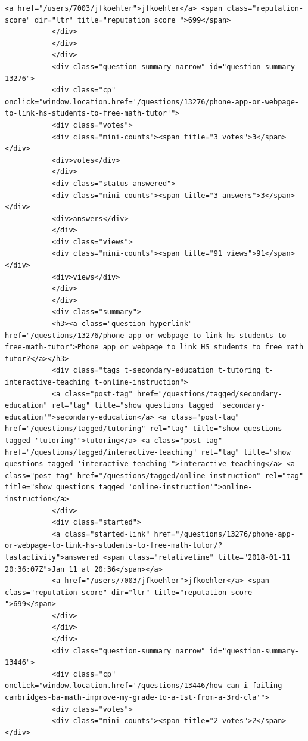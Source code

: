 \documentclass[11pt]{article}
\begin{document}
\begin{Verbatim}[commandchars=\\\{\}]
           <a href="/users/7003/jfkoehler">jfkoehler</a> <span class="reputation-score" dir="ltr" title="reputation score ">699</span>
           </div>
           </div>
           </div>
           <div class="question-summary narrow" id="question-summary-13276">
           <div class="cp" onclick="window.location.href='/questions/13276/phone-app-or-webpage-to-link-hs-students-to-free-math-tutor'">
           <div class="votes">
           <div class="mini-counts"><span title="3 votes">3</span></div>
           <div>votes</div>
           </div>
           <div class="status answered">
           <div class="mini-counts"><span title="3 answers">3</span></div>
           <div>answers</div>
           </div>
           <div class="views">
           <div class="mini-counts"><span title="91 views">91</span></div>
           <div>views</div>
           </div>
           </div>
           <div class="summary">
           <h3><a class="question-hyperlink" href="/questions/13276/phone-app-or-webpage-to-link-hs-students-to-free-math-tutor">Phone app or webpage to link HS students to free math tutor?</a></h3>
           <div class="tags t-secondary-education t-tutoring t-interactive-teaching t-online-instruction">
           <a class="post-tag" href="/questions/tagged/secondary-education" rel="tag" title="show questions tagged 'secondary-education'">secondary-education</a> <a class="post-tag" href="/questions/tagged/tutoring" rel="tag" title="show questions tagged 'tutoring'">tutoring</a> <a class="post-tag" href="/questions/tagged/interactive-teaching" rel="tag" title="show questions tagged 'interactive-teaching'">interactive-teaching</a> <a class="post-tag" href="/questions/tagged/online-instruction" rel="tag" title="show questions tagged 'online-instruction'">online-instruction</a>
           </div>
           <div class="started">
           <a class="started-link" href="/questions/13276/phone-app-or-webpage-to-link-hs-students-to-free-math-tutor/?lastactivity">answered <span class="relativetime" title="2018-01-11 20:36:07Z">Jan 11 at 20:36</span></a>
           <a href="/users/7003/jfkoehler">jfkoehler</a> <span class="reputation-score" dir="ltr" title="reputation score ">699</span>
           </div>
           </div>
           </div>
           <div class="question-summary narrow" id="question-summary-13446">
           <div class="cp" onclick="window.location.href='/questions/13446/how-can-i-failing-cambridges-ba-math-improve-my-grade-to-a-1st-from-a-3rd-cla'">
           <div class="votes">
           <div class="mini-counts"><span title="2 votes">2</span></div>

\end{Verbatim}
\end{document}
